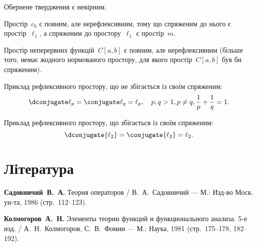 \begin{remark}
    Обернене твердження є невірним.
\end{remark}

\begin{example}
    Простір~$c_0$ є повним, але нерефлексивним, тому що спряженим до нього є простір~$\ell_1$, а спряженим до простору~$\ell_1$ є простір~$m$.
\end{example}

\begin{example}
    Простір неперервних функцій~$C[a, b]$ є повним, але нерефлексивним (більше того, немає жодного нормованого простору, для якого простір~$C[a, b]$ був би спряженим).
\end{example}

\begin{example}
    Приклад рефлексивного простору, що не збігається із своїм спряженим:
    \begin{equation*}
        \dconjugate \ell_p = \conjugate \ell_q = \ell_p, \quad p, q > 1, p \ne q, \frac{1}{p} + \frac{1}{q} = 1.
    \end{equation*}
\end{example}

\begin{example}
    Приклад рефлексивного простору, що збігається із своїм спряженим:
    \begin{equation*}
        \dconjugate{\ell_2} = \conjugate{\ell_2} = \ell_2.
    \end{equation*}
\end{example}

\section{Література}

\begin{enumerate}[label={[\arabic*]}]
\item \textbf{Садовничий~В.~А.}
Теория операторов /
В.~А.~Садовничий ---
М.: Изд-во Моск. ун-та, 1986 (стр.~112--123).
\item \textbf{Колмогоров~А.~Н.}
Элементы теории функций и функционального анализа. 5-е изд. /
А.~Н.~Колмогоров, С.~В.~Фомин ---
М.: Наука, 1981 (стр.~175--178, 182--192).
\end{enumerate}
